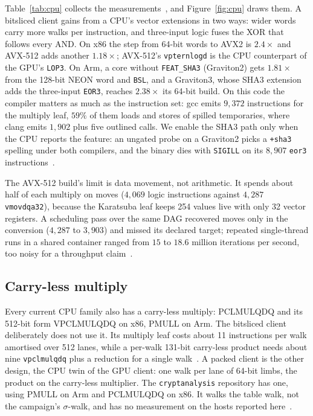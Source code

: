 Table~\ref{tab:cpu} collects the measurements~,
and Figure~\ref{fig:cpu} draws them. A bitsliced client gains from a
CPU's vector extensions in two ways: wider words carry more walks per
instruction, and three-input logic fuses the XOR that follows every AND.
On x86 the step from 64-bit words to AVX2 is $2.4\times$ and AVX-512 adds
another $1.18\times$; AVX-512's \texttt{vpternlogd} is the CPU counterpart
of the GPU's \texttt{LOP3}. On Arm, a core without \texttt{FEAT\_SHA3}
(Graviton2) gets $1.81\times$ from the 128-bit NEON word and \texttt{BSL},
and a Graviton3, whose SHA3 extension adds the three-input \texttt{EOR3},
reaches $2.38\times$ its 64-bit build. On this code the compiler matters as much as
the instruction set: gcc emits $9{,}372$ instructions for the multiply
leaf, $59\%$ of them loads and stores of spilled temporaries, where clang
emits $1{,}902$ plus five outlined calls. We enable the SHA3 path only when
the CPU reports the feature: an ungated probe on a Graviton2 picks a
\texttt{+sha3} spelling under both compilers, and the binary dies with
\texttt{SIGILL} on its $8{,}907$ \texttt{eor3}
instructions~.

The AVX-512 build's limit is data movement, not arithmetic. It spends
about half of each multiply on moves ($4{,}069$ logic instructions
against $4{,}287$ \texttt{vmovdqa32}), because the Karatsuba leaf keeps
254 values live with only 32 vector registers. A scheduling pass over
the same DAG recovered moves only in the conversion ($4{,}287$ to
$3{,}903$) and missed its declared target; repeated single-thread runs in
a shared container ranged from $15$ to $18.6$ million iterations per
second, too noisy for a throughput claim~.

\subsection{Carry-less multiply}
\label{sec:cpu-clmul}

Every current CPU family also has a carry-less multiply: PCLMULQDQ and
its 512-bit form VPCLMULQDQ on x86, PMULL on Arm. The bitsliced client
deliberately does not use it. Its multiply leaf costs about 11
instructions per walk amortised over 512 lanes, while a per-walk 131-bit
carry-less product needs about nine \texttt{vpclmulqdq} plus a reduction
for a single walk~. A packed client is the
other design, the CPU twin of the GPU client: one walk per lane of
64-bit limbs, the product on the carry-less multiplier. The
\texttt{cryptanalysis} repository has one, using PMULL on Arm and
PCLMULQDQ on x86. It walks the table walk, not the campaign's
$\sigma$-walk, and has no measurement on the hosts reported
here~.

